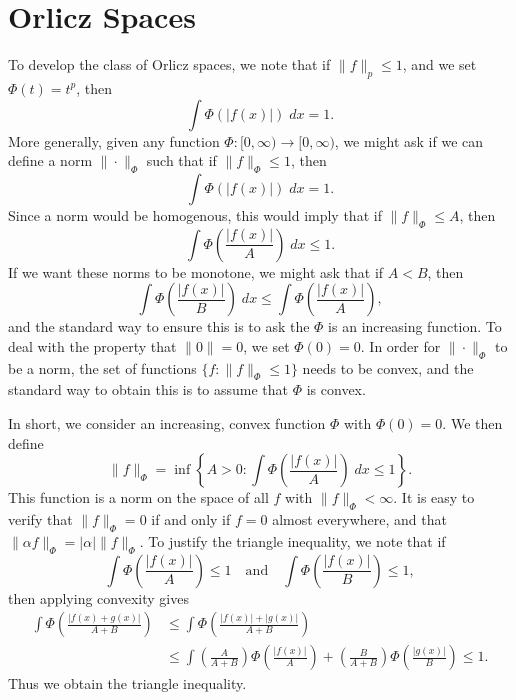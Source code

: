 \section{Orlicz Spaces}

To develop the class of Orlicz spaces, we note that if $\| f \|_p \leq 1$, and we set $\Phi(t) = t^p$, then
%
\[ \int \Phi \left( |f(x)| \right)\; dx = 1. \]
%
More generally, given any function $\Phi: [0,\infty) \to [0,\infty)$, we might ask if we can define a norm $\| \cdot \|_\Phi$ such that if $\| f \|_\Phi \leq 1$, then
%
\[ \int \Phi \left( |f(x)| \right)\; dx = 1. \]
%
Since a norm would be homogenous, this would imply that if $\| f \|_\Phi \leq A$, then
%
\[ \int \Phi \left( \frac{|f(x)|}{A} \right)\; dx \leq 1. \]
%
If we want these norms to be monotone, we might ask that if $A < B$, then
%
\[ \int \Phi \left( \frac{|f(x)|}{B} \right)\; dx \leq \int \Phi \left( \frac{|f(x)|}{A} \right), \]
%
and the standard way to ensure this is to ask the $\Phi$ is an increasing function. To deal with the property that $\| 0 \| = 0$, we set $\Phi(0) = 0$. In order for $\| \cdot \|_\Phi$ to be a norm, the set of functions $\{ f : \| f \|_\Phi \leq 1 \}$ needs to be convex, and the standard way to obtain this is to assume that $\Phi$ is convex.

In short, we consider an increasing, convex function $\Phi$ with $\Phi(0) = 0$. We then define
%
\[ \| f \|_\Phi = \inf \left\{ A > 0 : \int \Phi \left( \frac{|f(x)|}{A} \right)\; dx \leq 1 \right\}. \]
%
This function is a norm on the space of all $f$ with $\| f \|_\Phi < \infty$. It is easy to verify that $\| f \|_\Phi = 0$ if and only if $f = 0$ almost everywhere, and that $\| \alpha f \|_\Phi = |\alpha| \| f \|_\Phi$. To justify the triangle inequality, we note that if
%
\[ \int \Phi \left( \frac{|f(x)|}{A} \right) \leq 1 \quad\text{and} \quad \int \Phi \left( \frac{|f(x)|}{B} \right) \leq 1, \]
%
then applying convexity gives
%
\begin{align*}
    \int \Phi \left( \frac{|f(x) + g(x)|}{A + B} \right) &\leq \int \Phi \left( \frac{|f(x)| + |g(x)|}{A + B} \right)\\
    &\leq \int \left( \frac{A}{A + B} \right) \Phi \left( \frac{|f(x)|}{A} \right) + \left( \frac{B}{A + B} \right) \Phi \left( \frac{|g(x)|}{B} \right) \leq 1.
\end{align*}
%
Thus we obtain the triangle inequality.

